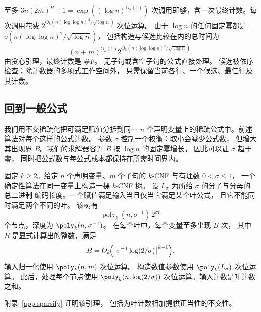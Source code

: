 至多 $3n(2m)^P+1=\exp((\log n)^{O_k(1)})$
次调用即够，含一次最终计数。每次调用花费
$2^{O_k(n(\log\log n)^2/\sqrt{\log n})}$ 次位运算。
由于 $\log n$ 的任何固定幂都是
$o(n(\log\log n)^2/\sqrt{\log n})$，
包括构造与候选比较在内的总时间为
\begin{equation}\label{eq:sparse-formula-cost}
 (n+m)^{O_k(1)}2^{O_k(n(\log\log n)^2/\sqrt{\log n})}.
\end{equation}
由贪心引理，最终计数是 $\#F$。
无子句或含空子句的公式直接处理。
候选被依序检查；除计数器的多项式工作空间外，
只需保留当前各行、一个候选、最佳行及其计数。

\subsection{回到一般公式}\label{subsec:general-reduction}

我们用不交稀疏化把可满足赋值分拆到同一 $n$
个声明变量上的稀疏公式中。前述算法对每个这样的公式计数。
参数 $\sigma$ 控制一个权衡：取小会减少公式数，
但增大其出现界 $B$。我们的求解器容许 $B$
按 $\log n$ 的固定幂增长，
因此可以让 $\sigma$ 趋于零，
同时把公式数与每公式成本都保持在所需时间界内。

\begin{lemma}\label{lem:sparsify}
固定 $k\ge2$。给定 $n$ 个声明变量、$m$
个子句的 $k$-CNF 与有理数 $0<\sigma\le1$，
一个确定性算法在同一变量上构造一棵 $k$-CNF 树。
设 $L_\sigma$ 为所给 $\sigma$ 的分子与分母的总二进制
编码长度。一个赋值满足输入当且仅当它满足某个叶公式，
且它不能同时满足两个不同的叶。
该树有
\[
 \operatorname{poly}_k(n,\sigma^{-1})\,2^{\sigma n}
\]
个节点，深度为 $\poly_k(n,\sigma^{-1})$。
在每个叶中，每个变量至多出现 $B$ 次，
其中 $B$ 是显式计算出的整数，满足
\[
 B=O_k\!\Bigl(\bigl[\sigma^{-1}\log(2/\sigma)\bigr]^{k-1}\Bigr).
\]
输入归一化使用 $\poly_k(n,m)$ 次位运算。
构造数值参数使用 $\poly_k(L_\sigma)$ 次位运算。
此后，处理每个节点使用 $\poly_k(n,\log(2/\sigma))$
次位运算。输入计数是叶计数之和。
\end{lemma}
附录~\ref{app:sparsify} 证明该引理，
包括为叶计数相加提供正当性的不交性。

